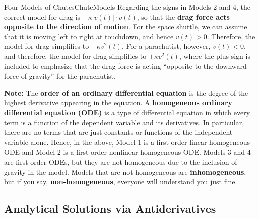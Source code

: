 \begin{factColor}{Four Models of Chutes}{ChuteModels}
Regarding the signs in Models 2 and 4, the correct model for drag is $-\kappa |v(t)|\cdot v(t)$, so that the \textbf{drag force acts opposite to the direction of motion}. For the space shuttle, we can assume that it is moving left to right at touchdown, and hence $v(t)>0$. Therefore, the model for drag simplifies to $ - \kappa v^2(t)$. For a parachutist, however, $v(t)<0$, and therefore, the model for drag simplifies to $+\kappa v^2(t)$, where the plus sign is included to emphasize that the drag force is acting ``opposite to the downward force of gravity'' for the parachutist.

\bigskip
\textbf{Note:} The \textbf{order of an ordinary differential equation} is the degree of the highest derivative appearing in the equation. A \textbf{homogeneous ordinary differential equation (ODE)} is a type of differential equation in which every term is a function of the dependent variable and its derivatives. In particular, there are no terms that are just constants or functions of the independent variable alone. Hence, in the above, Model 1 is a first-order linear homogeneous ODE and Model 2 is a first-order nonlinear homogeneous ODE. Models 3 and 4 are first-order ODEs, but they are not homogeneous due to the inclusion of gravity in the model. Models that are not homogeneous are \textbf{inhomogeneous}, but if you say, \textbf{non-homogeneous}, everyone will understand you just fine.
    
\end{factColor}


\bigskip




\bigskip

\subsection{Analytical Solutions via Antiderivatives}

